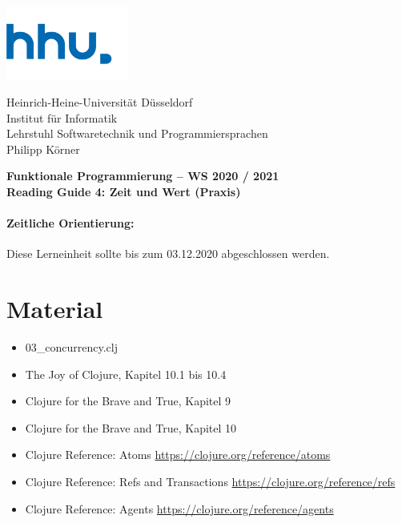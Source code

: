 \documentclass[11pt,a4paper]{article}
\theoremstyle{break}
\begin{document}
\begin{minipage}[b]{\textwidth}
\parbox[t]{5cm}{%
\includegraphics[width=4cm]{unilogo}
\hfill
}
\parbox[b]{11cm}{%
Heinrich-Heine-Universit\"at D\"usseldorf\\
Institut f\"ur Informatik\\
Lehrstuhl Softwaretechnik und Programmiersprachen\\
Philipp K\"orner
}

\end{minipage}
\begin{center}
\bf
Funktionale Programmierung -- WS 2020 / 2021\\
Reading Guide 4: Zeit und Wert (Praxis)
\end{center}

\pagestyle{empty}

\paragraph{Zeitliche Orientierung:} Diese Lerneinheit sollte bis zum 03.12.2020 abgeschlossen werden.

\section{Material} 

\begin{itemize}
    \item 03\_concurrency.clj
    \item The Joy of Clojure, Kapitel 10.1 bis 10.4
    \item Clojure for the Brave and True, Kapitel 9
    \item Clojure for the Brave and True, Kapitel 10
    \item Clojure Reference: Atoms \url{https://clojure.org/reference/atoms}
    \item Clojure Reference: Refs and Transactions \url{https://clojure.org/reference/refs}
    \item Clojure Reference: Agents \url{https://clojure.org/reference/agents}
\end{itemize}
\end{document}
